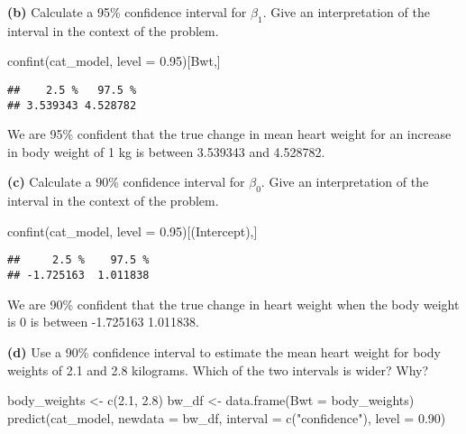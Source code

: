 \documentclass[
]{article}
\newenvironment{Shaded}{\begin{snugshade}}{\end{snugshade}}
\newcommand{\AttributeTok}[1]{\textcolor[rgb]{0.77,0.63,0.00}{#1}}
\newcommand{\FloatTok}[1]{\textcolor[rgb]{0.00,0.00,0.81}{#1}}
\newcommand{\FunctionTok}[1]{\textcolor[rgb]{0.00,0.00,0.00}{#1}}
\newcommand{\NormalTok}[1]{#1}
\newcommand{\OtherTok}[1]{\textcolor[rgb]{0.56,0.35,0.01}{#1}}
\newcommand{\StringTok}[1]{\textcolor[rgb]{0.31,0.60,0.02}{#1}}
\begin{document}
\textbf{(b)} Calculate a 95\% confidence interval for \(\beta_1\). Give
an interpretation of the interval in the context of the problem.

\begin{Shaded}
\begin{Highlighting}[]
\FunctionTok{confint}\NormalTok{(cat\_model, }\AttributeTok{level =} \FloatTok{0.95}\NormalTok{)[}\StringTok{\textquotesingle{}Bwt\textquotesingle{}}\NormalTok{,]}
\end{Highlighting}
\end{Shaded}

\begin{verbatim}
##    2.5 %   97.5 % 
## 3.539343 4.528782
\end{verbatim}

We are 95\% confident that the true change in mean heart weight for an
increase in body weight of 1 kg is between 3.539343 and 4.528782.

\textbf{(c)} Calculate a 90\% confidence interval for \(\beta_0\). Give
an interpretation of the interval in the context of the problem.

\begin{Shaded}
\begin{Highlighting}[]
\FunctionTok{confint}\NormalTok{(cat\_model, }\AttributeTok{level =} \FloatTok{0.95}\NormalTok{)[}\StringTok{\textquotesingle{}(Intercept)\textquotesingle{}}\NormalTok{,]}
\end{Highlighting}
\end{Shaded}

\begin{verbatim}
##     2.5 %    97.5 % 
## -1.725163  1.011838
\end{verbatim}

We are 90\% confident that the true change in heart weight when the body
weight is 0 is between -1.725163 1.011838.

\textbf{(d)} Use a 90\% confidence interval to estimate the mean heart
weight for body weights of 2.1 and 2.8 kilograms. Which of the two
intervals is wider? Why?

\begin{Shaded}
\begin{Highlighting}[]
\NormalTok{body\_weights }\OtherTok{\textless{}{-}} \FunctionTok{c}\NormalTok{(}\FloatTok{2.1}\NormalTok{, }\FloatTok{2.8}\NormalTok{)}
\NormalTok{bw\_df }\OtherTok{\textless{}{-}} \FunctionTok{data.frame}\NormalTok{(}\AttributeTok{Bwt =}\NormalTok{ body\_weights)}
\FunctionTok{predict}\NormalTok{(cat\_model,  }\AttributeTok{newdata =}\NormalTok{ bw\_df, }
        \AttributeTok{interval =} \FunctionTok{c}\NormalTok{(}\StringTok{"confidence"}\NormalTok{), }\AttributeTok{level =} \FloatTok{0.90}\NormalTok{)}
\end{Highlighting}
\end{Shaded}
\end{document}
